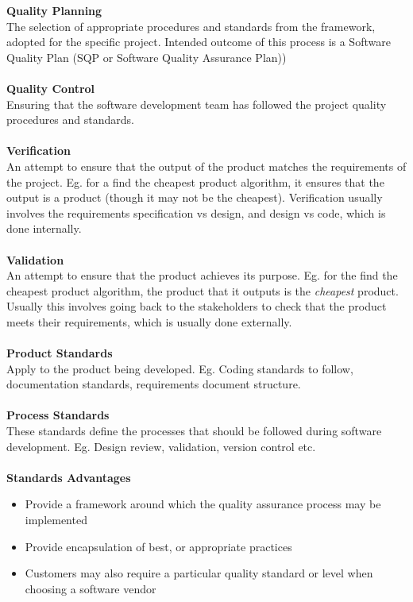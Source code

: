 \documentclass[a4paper,10pt]{article}
\begin{document}
\textcolor{BlueGreen}{\textbf{Quality Planning}} \\ 
The selection of appropriate procedures and standards from the framework, adopted for the specific project. Intended outcome of this process is a Software Quality Plan (SQP or Software Quality Assurance Plan))\\\\
\textcolor{BlueGreen}{\textbf{Quality Control}} \\ 
Ensuring that the software development team has followed the project quality procedures and standards. \\\\
\textcolor{BlueGreen}{\textbf{Verification}} \\ 
An attempt to ensure that the output of the product matches the requirements of the project. Eg. for a find the cheapest product algorithm, it ensures that the output is a product (though it may not be the cheapest). Verification usually involves the requirements specification vs design, and design vs code, which is done internally. \\\\
\textcolor{BlueGreen}{\textbf{Validation}} \\ 
An attempt to ensure that the product achieves its purpose. Eg. for the find the cheapest product algorithm, the product that it outputs is the \textit{cheapest} product. Usually this involves going back to the stakeholders to check that the product meets their requirements, which is usually done externally. \\\\
\textcolor{BlueGreen}{\textbf{Product Standards}} \\ 
Apply to the product being developed. Eg. Coding standards to follow, documentation standards, requirements document structure. \\\\
\textcolor{BlueGreen}{\textbf{Process Standards}} \\ 
These standards define the processes that should be followed during software development. Eg. Design review, validation, version control etc.\\\\ 
\textcolor{BlueGreen}{\textbf{Standards Advantages}} 
\begin{itemize}
	\item Provide a framework around which the quality assurance process may be implemented 
	\item Provide encapsulation of best, or appropriate practices 
	\item Customers may also require a particular quality standard or level when choosing a software vendor 
\end{itemize}
\end{document}
